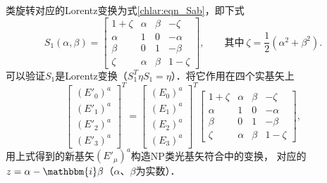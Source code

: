 类旋转对应的Lorentz变换为式\eqref{chlar:eqn_Sab}，即下式
\begin{equation} \label{chnull:eqn_Sab1}
    S_1( {\alpha ,\beta } ) =
    \begin{bmatrix}
        1 + \zeta & \alpha&\beta&{ - \zeta }  \\
        \alpha &   1&0&{ - \alpha }\\
        \beta  &   0&1&{ - \beta  } \\
        \zeta  &   \alpha&\beta&{1 - \zeta }
    \end{bmatrix},
    \qquad \text{其中}\ \zeta = \frac{1}{2}(\alpha^2+\beta^2).
\end{equation}
可以验证$S_1$是Lorentz变换（$S_1^T \eta S_1 = \eta$）．将它作用在四个实基矢上
\begin{equation*}
    \begin{bmatrix}
        (E'_0)^a \\ (E'_1)^a \\ (E'_2)^a \\ (E'_3)^a
    \end{bmatrix}^T =
    \begin{bmatrix}
        (E_0)^a \\ (E_1)^a \\ (E_2)^a \\ (E_3)^a
    \end{bmatrix} ^T
    \begin{bmatrix}
        1 + \zeta & \alpha&\beta&{ - \zeta }  \\
        \alpha &   1&0&{ - \alpha }\\
        \beta  &   0&1&{ - \beta  } \\
        \zeta  &   \alpha&\beta&{1 - \zeta }
    \end{bmatrix},
\end{equation*}
用上式得到的新基矢$(E'_\mu)^a$构造NP类光基矢符合中的变换，
对应的$z=\alpha -\mathbbm{i} \beta$（$\alpha$、$\beta$为实数）．

